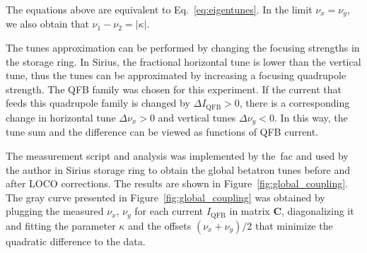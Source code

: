 The equations above are equivalent to Eq.~\eqref{eq:eigentunes}. In the limit $\nu_x = \nu_y$, we also obtain that $\nu_1 - \nu_2 = |\kappa|$.

The tunes approximation can be performed by changing the focusing strengths in the storage ring. In Sirius, the fractional horizontal tune is lower than the vertical tune, thus the tunes can be approximated by increasing a focusing quadrupole strength. The QFB family was chosen for this experiment. If the current that feeds this quadrupole family is changed by $\Delta I_{\mathrm{QFB}}>0$, there is a corresponding change in horizontal tune $\Delta\nu_x > 0$ and vertical tunes $\Delta\nu_y < 0$. In this way, the tune sum and the difference can be viewed as functions of QFB current.

The measurement script and analysis was implemented by the~\gls{fac} and used by the author in Sirius storage ring to obtain the global betatron tunes before and after LOCO corrections. The results are shown in Figure~\ref{fig:global_coupling}. The gray curve presented in Figure~\ref{fig:global_coupling} was obtained by plugging the measured $\nu_x$, $\nu_y$ for each current $I_{\mathrm{QFB}}$ in matrix $\mathbf{C}$, diagonalizing it and fitting the parameter $\kappa$ and the offsets $(\nu_x+\nu_y)/2$ that minimize the quadratic difference to the data.
